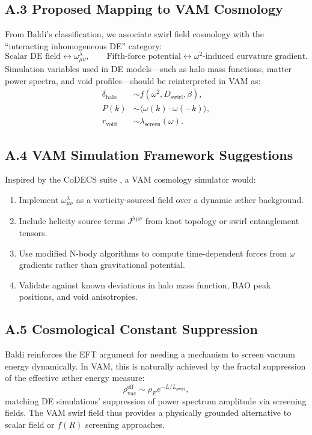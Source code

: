 \documentclass[11pt]{article}
\begin{document}
    \subsection*{A.3 Proposed Mapping to VAM Cosmology}
    From Baldi's classification, we associate swirl field cosmology with the ``interacting inhomogeneous DE'' category:
    \[
        \text{Scalar DE field} \leftrightarrow \omega^\lambda_{\mu\nu}, \qquad \text{Fifth-force potential} \leftrightarrow \omega^2\text{-induced curvature gradient}.
    \]
    Simulation variables used in DE models—such as halo mass functions, matter power spectra, and void profiles—should be reinterpreted in VAM as:
    \begin{align*}
        \delta_{\text{halo}} &\sim f(\omega^2, D_\text{swirl}, \beta), \\
        P(k) &\sim \langle \omega(k) \cdot \omega(-k) \rangle, \\
        r_{\text{void}} &\sim \lambda_{\text{screen}}(\omega).
    \end{align*}

    \subsection*{A.4 VAM Simulation Framework Suggestions}
    Inspired by the CoDECS suite \cite{baldi2012codecs}, a VAM cosmology simulator would:
    \begin{enumerate}
        \item Implement $\omega^\lambda_{\mu\nu}$ as a vorticity-sourced field over a dynamic æther background.
        \item Include helicity source terms $J^{\lambda\mu\nu}$ from knot topology or swirl entanglement tensors.
        \item Use modified N-body algorithms to compute time-dependent forces from $\omega$ gradients rather than gravitational potential.
        \item Validate against known deviations in halo mass function, BAO peak positions, and void anisotropies.
    \end{enumerate}

    \subsection*{A.5 Cosmological Constant Suppression}
    Baldi reinforces the EFT argument for needing a mechanism to screen vacuum energy dynamically. In VAM, this is naturally achieved by the fractal suppression of the effective æther energy measure:
    \[
        \rho_{\text{vac}}^{\text{eff}} \sim \rho_{\scriptscriptstyle\boldsymbol\!E}e^{-L / L_\text{swirl}},
    \]
    matching DE simulations' suppression of power spectrum amplitude via screening fields. The VAM swirl field thus provides a physically grounded alternative to scalar field or $f(R)$ screening approaches.



    
    
\end{document}
